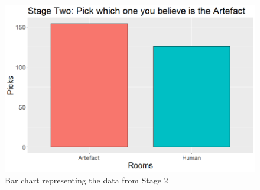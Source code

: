 \begin{figure}[!ht]
    \includegraphics[width=\columnwidth]{./Images/stage-2-picks-graph.png}
    \centering
    \caption{Bar chart representing the data from Stage 2}
    \label{stage-2-graph}
\end{figure}